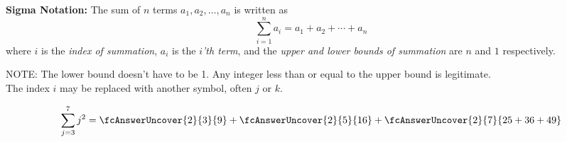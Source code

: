 \begin{frame}
\begin{definition}
 {\bf Sigma Notation:} The sum of $n$ terms $a_1,a_2,\ldots,a_n$ is written as
\[
\sum_{i=1}^n a_i=a_1+a_2+\cdots+a_n
\]
where $i$ is the {\it index of summation}, $a_i$ is the {\it{$i$'th term}}, and the 
{\it{upper and lower bounds of summation}} are $n$ and $1$ respectively.
\end{definition}
NOTE:  The lower bound doesn't have to be 1. 
 Any integer less than or equal to the upper bound is legitimate.\\
The index $i$ may be replaced with another symbol, often $j$ or $k$.\\
\pause
\begin{example}
\[
\sum_{j=3}^7 j^2= \fcAnswerUncover{2}{3}{9}+  \fcAnswerUncover{2}{5}{16}+\fcAnswerUncover{2}{7}{25+36+49} 
\]
\end{example}

\end{frame}
